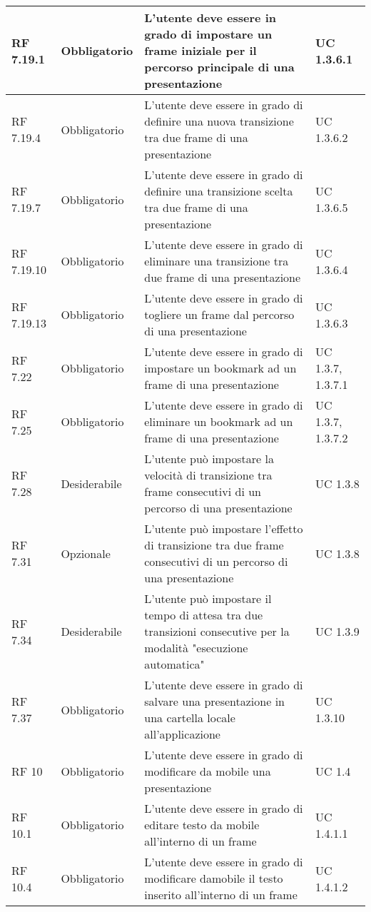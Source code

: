 {\begin{longtable} [c]{| p{2.5cm} | p{2.5cm} | p{6cm} |p{2.5cm}|}
			RF 7.19.1 & Obbligatorio & L'utente deve essere in grado di impostare un frame iniziale per il percorso principale di una presentazione & UC 1.3.6.1\\
			\hline
			RF 7.19.4 & Obbligatorio & L’utente deve essere in grado di definire una nuova transizione tra due frame di una presentazione & UC 1.3.6.2\\
			\hline
			RF 7.19.7 & Obbligatorio & L'utente deve essere in grado di definire una transizione scelta tra due frame di una presentazione & UC 1.3.6.5\\
			\hline
			RF 7.19.10 & Obbligatorio & L'utente deve essere in grado di eliminare una transizione tra due frame di una presentazione & UC 1.3.6.4\\
			\hline
			RF 7.19.13 & Obbligatorio & L'utente deve essere in grado di togliere un frame dal percorso di una presentazione & UC 1.3.6.3\\
			\hline
			RF 7.22 & Obbligatorio & L'utente deve essere in grado di impostare un bookmark ad un frame di una presentazione & UC 1.3.7, 1.3.7.1\\
			\hline
			RF 7.25 & Obbligatorio & L'utente deve essere in grado di eliminare un bookmark ad un frame di una presentazione & UC 1.3.7, 1.3.7.2\\
			\hline
			RF 7.28 & Desiderabile & L'utente può impostare la velocità di transizione tra frame consecutivi di un percorso di una presentazione & UC 1.3.8\\
			\hline
			RF 7.31 & Opzionale & L'utente può impostare l’effetto di transizione tra due frame consecutivi di un percorso di una presentazione & UC 1.3.8\\
			\hline
			RF 7.34 & Desiderabile & L'utente può impostare il tempo di attesa tra due transizioni consecutive per la modalità "esecuzione automatica" & UC 1.3.9\\
			\hline
			RF 7.37 & Obbligatorio & L'utente deve essere in grado di salvare una presentazione in una cartella locale all'applicazione & UC 1.3.10\\
			\hline
			RF 10 & Obbligatorio & L'utente deve essere in grado di modificare da mobile una presentazione & UC 1.4\\
			\hline
			RF 10.1 & Obbligatorio & L'utente deve essere in grado di editare testo da mobile all'interno di un frame & UC 1.4.1.1\\
			\hline
			RF 10.4 & Obbligatorio & L'utente deve essere in grado di modificare damobile il testo inserito all'interno di un frame & UC 1.4.1.2\\

\end{longtable}}
